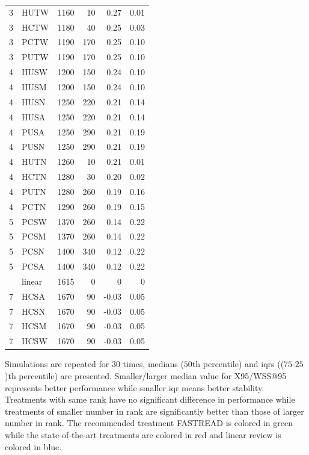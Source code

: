 \documentclass{svjour3}
\theoremstyle{break}
\begin{document}
\begin{table}
\begin{center}
{{\begin{tabular}{l@{~~~}l@{~~~}r@{~~~}r@{~~~}r@{~~~}r}
  3 &         HUTW &    1160  &  10 & 0.27 & 0.01 \\
  3 &         HCTW &    1180  &  40 & 0.25 & 0.03 \\
  \rowcolor{red!30}
  3 &         PCTW &    1190  &  170 & 0.25 & 0.10 \\
  3 &         PUTW &    1190  &  170 & 0.25 & 0.10 \\
\hline  4 &         HUSW &    1200  &  150 & 0.24 & 0.10 \\
  4 &         HUSM &    1200  &  150 & 0.24 & 0.10 \\
  4 &         HUSN &    1250  &  220 & 0.21 & 0.14 \\
  4 &         HUSA &    1250  &  220 & 0.21 & 0.14 \\
  \rowcolor{red!30}
  4 &         PUSA &    1250  &  290 & 0.21 & 0.19 \\
  4 &         PUSN &    1250  &  290 & 0.21 & 0.19 \\
  4 &         HUTN &    1260  &  10 & 0.21 & 0.01 \\
  \rowcolor{red!30}
  4 &         HCTN &    1280  &  30 & 0.20 & 0.02 \\
  4 &         PUTN &    1280  &  260 & 0.19 & 0.16 \\
  4 &         PCTN &    1290  &  260 & 0.19 & 0.15 \\
\hline  5 &         PCSW &    1370  &  260 & 0.14 & 0.22 \\
  5 &         PCSM &    1370  &  260 & 0.14 & 0.22 \\
  5 &         PCSN &    1400  &  340 & 0.12 & 0.22 \\
  5 &         PCSA &    1400  &  340 & 0.12 & 0.22 \\
\rowcolor{blue!50}
\hline  6 &       linear &    1615  &  0 & 0 & 0 \\
\hline  7 &         HCSA &    1670  &  90 & -0.03 & 0.05 \\
  7 &         HCSN &    1670  &  90 & -0.03 & 0.05 \\
  7 &         HCSM &    1670  &  90 & -0.03 & 0.05 \\
  7 &         HCSW &    1670  &  90 & -0.03 & 0.05 \\
\hline \end{tabular}}}

\end{center}
{\footnotesize Simulations are repeated for $30$ times, medians ($50$th percentile) and iqrs (($75$-$25$)th percentile) are presented. Smaller/larger median value for X95/WSS@95 represents better performance while smaller iqr means better stability. Treatments with same rank have no significant difference in performance while treatments of smaller number in rank are significantly better than those of larger number in rank. The recommended treatment FASTREAD is colored in {\setlength{\fboxsep}{1pt}\colorbox{green!40}{green}} while the state-of-the-art treatments are colored in {\setlength{\fboxsep}{1pt}\colorbox{red!30}{red}} and linear review is colored in {\setlength{\fboxsep}{1pt}\colorbox{blue!50}{blue}}.}


\end{table}
\end{document}
